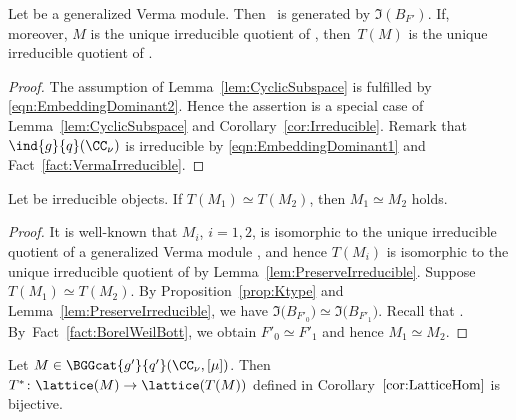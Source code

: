 \begin{Lemma}\label{lem:PreserveIrreducible}
	Let  be a generalized Verma module.
	Then ~is generated by $\Im(B_{F'})$.
	If, moreover, $M$ is the unique irreducible quotient of ,
	then~$T(M)$ is the unique irreducible quotient of .
\end{Lemma}

\begin{proof}
	The assumption of Lemma~\ref{lem:CyclicSubspace} is fulfilled by \eqref{eqn:EmbeddingDominant2}.
	Hence the assertion is a special case of Lemma~\ref{lem:CyclicSubspace} and Corollary~\ref{cor:Irreducible}.
	Remark that $\ind{g}{q}(\CC_\nu)$ is irreducible by \eqref{eqn:EmbeddingDominant1} and Fact~\ref{fact:VermaIrreducible}.
\end{proof}

\begin{Lemma}\label{lem:Injectivity}
	Let  be irreducible objects.
	If $T(M_1) \simeq T(M_2)$, then $M_1 \simeq M_2$ holds.
\end{Lemma}

\begin{proof}
	It is well-known that $M_i$, $i=1,2$, is isomorphic to the unique irreducible quotient of a generalized Verma module , and hence $T(M_i)$ is isomorphic to the unique irreducible quotient of  by Lemma~\ref{lem:PreserveIrreducible}.
	Suppose $T(M_1) \simeq T(M_2)$.
	By Proposition~\ref{prop:Ktype} and Lemma~\ref{lem:PreserveIrreducible}, we have $\Im\bigl(B_{F'_0}\bigr) \simeq \Im\bigl(B_{F'_1}\bigr)$.
	Recall that .
	By~Fact~\ref{fact:BorelWeilBott}, we obtain $F'_0 \simeq F'_1$ and hence $M_1 \simeq M_2$.
\end{proof}

\begin{Lemma}
	Let $M \in \BGGcat{g'}{q'}(\CC_\nu, [\mu])$.
	Then $T^*\colon \lattice(M) \rightarrow \lattice(T(M))$ defined in Corollary~$\ref{cor:LatticeHom}$ is bijective.
\end{Lemma}

